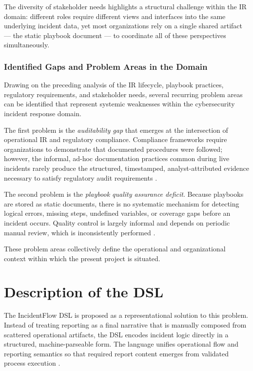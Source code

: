 The diversity of stakeholder needs highlights a structural challenge within the IR domain: different roles require different views and interfaces into the same underlying incident data, yet most organizations rely on a single shared artifact --- the static playbook document --- to coordinate all of these perspectives simultaneously.

\subsubsection{Identified Gaps and Problem Areas in the Domain}

Drawing on the preceding analysis of the IR lifecycle, playbook practices, regulatory requirements, and stakeholder needs, several recurring problem areas can be identified that represent systemic weaknesses within the cybersecurity incident response domain.

The first problem is the \textit{auditability gap} that emerges at the intersection of operational IR and regulatory compliance.
Compliance frameworks require organizations to demonstrate that documented procedures were followed; however, the informal, ad-hoc documentation practices common during live incidents rarely produce the structured, timestamped, analyst-attributed evidence necessary to satisfy regulatory audit requirements \citep{isaca2021}.

The second problem is the \textit{playbook quality assurance deficit}.
Because playbooks are stored as static documents, there is no systematic mechanism for detecting logical errors, missing steps, undefined variables, or coverage gaps before an incident occurs.
Quality control is largely informal and depends on periodic manual review, which is inconsistently performed \citep{sans2021}.

These problem areas collectively define the operational and organizational context within which the present project is situated.

\section{Description of the DSL}

The IncidentFlow DSL is proposed as a representational solution to this problem. Instead of treating reporting as a final narrative that is manually composed from scattered operational artifacts, the DSL encodes incident logic directly in a structured, machine-parseable form. The language unifies operational flow and reporting semantics so that required report content emerges from validated process execution \autocite{liu2019,cihml2023,dsldfir2019}.

